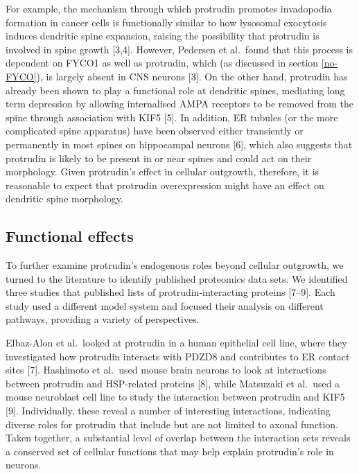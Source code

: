\documentclass[
  12pt,
  a4paper,
]{book}
\begin{document}
For example, the mechanism through which protrudin promotes invadopodia formation in cancer cells is functionally similar to how lysosomal exocytosis induces dendritic spine expansion, raising the possibility that protrudin is involved in spine growth {[}3,4{]}. However, Pedersen et al.~found that this process is dependent on FYCO1 as well as protrudin, which (as discussed in section \ref{no-FYCO}), is largely absent in CNS neurons {[}3{]}. On the other hand, protrudin has already been shown to play a functional role at dendritic spines, mediating long term depression by allowing internalised AMPA receptors to be removed from the spine through association with KIF5 {[}5{]}. In addition, ER tubules (or the more complicated spine apparatus) have been observed either transiently or permanently in most spines on hippocampal neurons {[}6{]}, which also suggests that protrudin is likely to be present in or near spines and could act on their morphology. Given protrudin's effect in cellular outgrowth, therefore, it is reasonable to expect that protrudin overexpression might have an effect on dendritic spine morphology.

\hypertarget{functional-effects}{%
\subsection{Functional effects}\label{functional-effects}}

To further examine protrudin's endogenous roles beyond cellular outgrowth, we turned to the literature to identify published proteomics data sets. We identified three studies that published lists of protrudin-interacting proteins {[}7--9{]}. Each study used a different model system and focused their analysis on different pathways, providing a variety of perspectives.

Elbaz-Alon et al.~looked at protrudin in a human epithelial cell line, where they investigated how protrudin interacts with PDZD8 and contributes to ER contact sites {[}7{]}. Hashimoto et al.~used mouse brain neurons to look at interactions between protrudin and HSP-related proteins {[}8{]}, while Matsuzaki et al.~used a mouse neuroblast cell line to study the interaction between protrudin and KIF5 {[}9{]}. Individually, these reveal a number of interesting interactions, indicating diverse roles for protrudin that include but are not limited to axonal function. Taken together, a substantial level of overlap between the interaction sets reveals a conserved set of cellular functions that may help explain protrudin's role in neurons.
\end{document}
